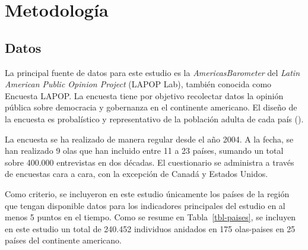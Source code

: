 \documentclass[
  spanish,
  letterpaper,
  DIV=11,
  numbers=noendperiod]{scrartcl}
\begin{document}
\section{Metodología}\label{metodologuxeda}

\subsection{Datos}\label{datos}

La principal fuente de datos para este estudio es la
\emph{AmericasBarometer} del \emph{Latin American Public Opinion
Project} (LAPOP Lab), también conocida como Encuesta LAPOP. La encuesta
tiene por objetivo recolectar datos la opinión pública sobre democracia
y gobernanza en el continente americano. El diseño de la encuesta es
probalístico y representativo de la población adulta de cada país
().

La encuesta se ha realizado de manera regular desde el año 2004. A la
fecha, se han realizado 9 olas que han incluido entre 11 a 23 países,
sumando un total sobre 400.000 entrevistas en dos décadas. El
cuestionario se administra a través de encuestas cara a cara, con la
excepción de Canadá y Estados Unidos.

Como criterio, se incluyeron en este estudio únicamente los países de la
región que tengan disponible datos para los indicadores principales del
estudio en al menos 5 puntos en el tiempo. Como se resume en
Tabla~\ref{tbl-paises}, se incluyen en este estudio un total de 240.452
individuos anidados en 175 olas-paises en 25 países del continente
americano.
\end{document}
